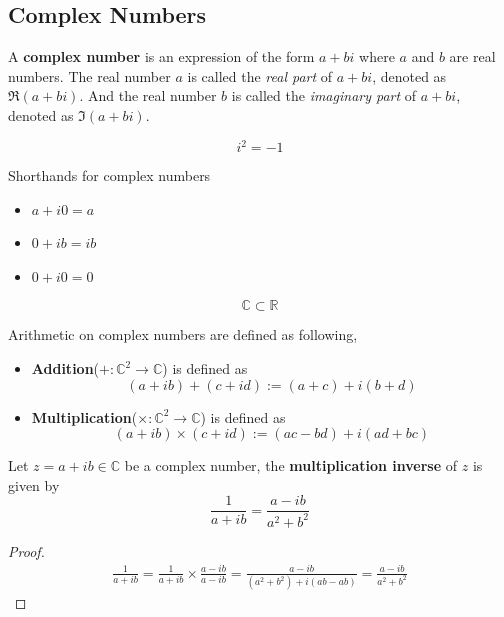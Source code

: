 \documentclass[10pt]{article}
\begin{document}
	\subsection{Complex Numbers}
	\begin{definition}[9.1.3]
		A \textbf{complex number} is an expression of the form $a+bi$ where $a$ and $b$ are real numbers. The real number $a$ is called the \emph{real part} of $a+bi$, denoted as $\Re(a+bi)$. And the real number $b$ is called the \emph{imaginary part} of $a+bi$, denoted as $\Im(a+bi)$.
	\end{definition}
	
	\begin{definition}
		\[
			i^2 = -1
		\]
	\end{definition}
	\begin{remark}
		Shorthands for complex numbers
		\begin{itemize}
			\item $a+i0=a$
			\item $0+ib=ib$
			\item $0+i0=0$
		\end{itemize}
	\end{remark}
	\begin{remark}
		\[
			\mathbb{C} \subset \mathbb{R}
		\]
	\end{remark}
	\begin{definition}
		Arithmetic on complex numbers are defined as following,
		\begin{itemize}
			\item \textbf{Addition}($+: \mathbb{C}^2 \to \mathbb{C}$) is defined as \[(a+ib)+(c+id):=(a+c)+i(b+d)\]
			\item \textbf{Multiplication}($\times: \mathbb{C}^2 \to \mathbb{C}$) is defined as \[(a+ib)\times(c+id):=(ac-bd) + i(ad + bc)\]
		\end{itemize}
	\end{definition}
	\begin{proposition}
		Let $z = a+ib \in \mathbb{C}$ be a complex number, the \textbf{multiplication inverse} of $z$ is given by 
		\[
			\frac{1}{a + ib} = \frac{a - ib}{a^2 + b^2}
		\]
	\end{proposition}
	\begin{proof}
		\begin{gather*}
			\frac{1}{a+ib} = \frac{1}{a+ib} \times \frac{a-ib}{a-ib} = \frac{a-ib}{(a^2 + b^2) + i(ab - ab)} = \frac{a-ib}{a^2 + b^2}
		\end{gather*}
	\end{proof}
	
\end{document}
